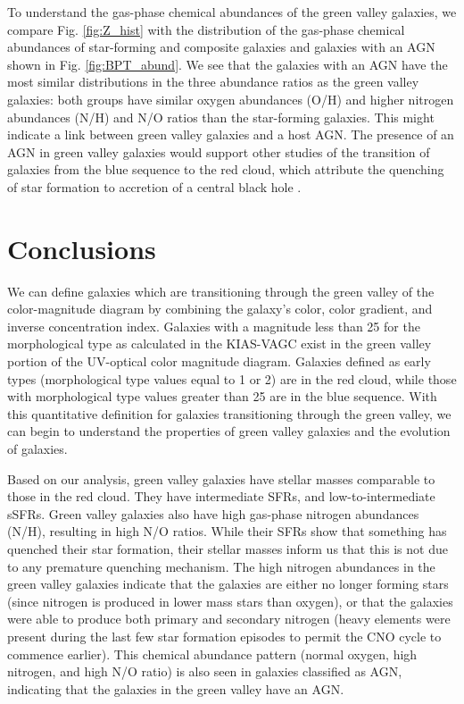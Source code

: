 To understand the gas-phase chemical abundances of the green valley galaxies, we 
compare Fig. \ref{fig:Z_hist} with the distribution of the gas-phase chemical 
abundances of star-forming and composite galaxies and galaxies with an AGN shown 
in Fig. \ref{fig:BPT_abund}.  We see that the galaxies with an AGN have the most 
similar distributions in the three abundance ratios as the green valley 
galaxies: both groups have similar oxygen abundances (O/H) and higher nitrogen 
abundances (N/H) and N/O ratios than the star-forming galaxies.  This might 
indicate a link between green valley galaxies and a host AGN.  The presence of 
an AGN in green valley galaxies would support other studies of the transition of 
galaxies from the blue sequence to the red cloud, which attribute the quenching 
of star formation to accretion of a central black hole \citep[e.g.,][]{Croton06,
Stasinska08}.





\section[Conclusions]{Conclusions}

We can define galaxies which are transitioning through the green valley of the 
color-magnitude diagram by combining the galaxy's color, color gradient, and 
inverse concentration index.  Galaxies with a magnitude less than 25 for the 
morphological type as calculated in the KIAS-VAGC exist in the green valley 
portion of the UV-optical color magnitude diagram.  Galaxies defined as early 
types (morphological type values equal to 1 or 2) are in the red cloud, while 
those with morphological type values greater than 25 are in the blue sequence.  
With this quantitative definition for galaxies transitioning through the green 
valley, we can begin to understand the properties of green valley galaxies and 
the evolution of galaxies.

Based on our analysis, green valley galaxies have stellar masses comparable to 
those in the red cloud.  They have intermediate SFRs, and low-to-intermediate 
sSFRs.  Green valley galaxies also have high gas-phase nitrogen abundances (N/H), 
resulting in high N/O ratios.  While their SFRs show that something has quenched 
their star formation, their stellar masses inform us that this is not due to any 
premature quenching mechanism.  The high nitrogen abundances in the green valley 
galaxies indicate that the galaxies are either no longer forming stars (since 
nitrogen is produced in lower mass stars than oxygen), or that the galaxies were 
able to produce both primary and secondary nitrogen (heavy elements were present 
during the last few star formation episodes to permit the CNO cycle to commence 
earlier).  This chemical abundance pattern (normal oxygen, high nitrogen, and 
high N/O ratio) is also seen in galaxies classified as AGN, indicating that the 
galaxies in the green valley have an AGN.

